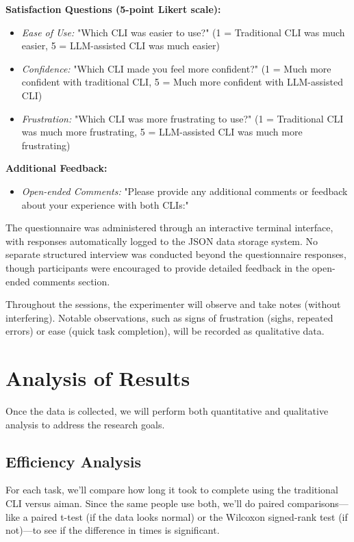 \textbf{Satisfaction Questions (5-point Likert scale):}
\begin{itemize}
	\item \textit{Ease of Use:} "Which CLI was easier to use?" (1 = Traditional CLI was much easier, 5 = LLM-assisted CLI was much easier)
	\item \textit{Confidence:} "Which CLI made you feel more confident?" (1 = Much more confident with traditional CLI, 5 = Much more confident with LLM-assisted CLI)
	\item \textit{Frustration:} "Which CLI was more frustrating to use?" (1 = Traditional CLI was much more frustrating, 5 = LLM-assisted CLI was much more frustrating)
\end{itemize}

\textbf{Additional Feedback:}
\begin{itemize}
	\item \textit{Open-ended Comments:} "Please provide any additional comments or feedback about your experience with both CLIs:"
\end{itemize}

The questionnaire was administered through an interactive terminal interface, with responses automatically logged to the JSON data storage system. No separate structured interview was conducted beyond the questionnaire responses, though participants were encouraged to provide detailed feedback in the open-ended comments section.

Throughout the sessions, the experimenter will observe and take notes (without interfering). Notable observations, such as signs of frustration (sighs, repeated errors) or ease (quick task completion), will be recorded as qualitative data.

\section{Analysis of Results}

Once the data is collected, we will perform both quantitative and qualitative analysis to address the research goals.

\subsection{Efficiency Analysis}

For each task, we'll compare how long it took to complete using the traditional CLI versus aiman. Since the same people use both, we'll do paired comparisons—like a paired t-test (if the data looks normal) or the Wilcoxon signed-rank test (if not)—to see if the difference in times is significant.

